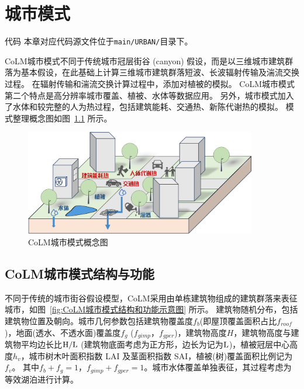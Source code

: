 \chapter{城市模式}\label{城市模式}
\begin{mymdframed}{代码}
本章对应代码源文件位于\texttt{main/URBAN/}目录下。
\end{mymdframed}

CoLM城市模式不同于传统城市冠层街谷 (canyon) 假设，而是以三维城市建筑群落为基本假设，在此基础上计算三维城市建筑群落短波、长波辐射传输及湍流交换过程。
在辐射传输和湍流交换计算过程中，添加对植被的模拟。
CoLM城市模式第二个特点是高分辨率城市覆盖、植被、水体等数据应用。
另外，城市模式加入了水体和较完整的人为热过程，包括建筑能耗、交通热、新陈代谢热的模拟。
模式整理概念图如图~\ref{fig:CoLM城市模式概念图} 所示。
\newline
{
\begin{figure}[htbp]
\centering
\includegraphics[width=0.9\textwidth]{Figures/城市模式/CoLM城市模式概念图.png}
\caption{CoLM城市模式概念图}
\label{fig:CoLM城市模式概念图}
\end{figure}
}

\section{CoLM城市模式结构与功能}
不同于传统的城市街谷假设模型，CoLM采用由单栋建筑物组成的建筑群落来表征城市，如图~\ref{fig:CoLM城市模式结构和功能示意图} 所示。
建筑物随机分布，包括建筑物位置及朝向。城市几何参数包括建筑物覆盖度$f_b$(即屋顶覆盖面积占比$f_{roof}$)，地面(透水、不透水面)覆盖度$f_g$ ($f_{gimp}$，$f_{gper}$)，建筑物高度$H$，建筑物高度与建筑物平均边长比$\rm H/L$ (建筑物底面考虑为正方形，边长为记为$\rm L$)，植被冠层中心高度$h_v$，城市树木叶面积指数 LAI 及茎面积指数 SAI，植被(树)覆盖面积比例记为$f_v$。
其中$f_b+f_g=1$，$f_{gimp}+f_{gper}=1$。城市水体覆盖单独表征，其过程考虑为等效湖泊进行计算。

